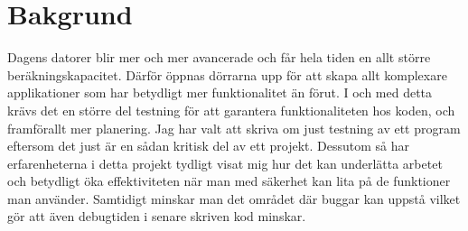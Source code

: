 \section{Bakgrund}	
	Dagens datorer blir mer och mer avancerade och får hela tiden en allt större beräkningskapacitet. Därför öppnas dörrarna upp för att skapa allt komplexare applikationer som har betydligt mer funktionalitet än förut. I och med detta krävs det en större del testning för att garantera funktionaliteten hos koden, och framförallt mer planering. \newline
	Jag har valt att skriva om just testning av ett program eftersom det just är en sådan kritisk del av ett projekt. Dessutom så har erfarenheterna i detta projekt tydligt visat mig hur det kan underlätta arbetet och betydligt öka effektiviteten när man med säkerhet kan lita på de funktioner man använder. Samtidigt minskar man det området där buggar kan uppstå vilket gör att även debugtiden i senare skriven kod minskar. \newline